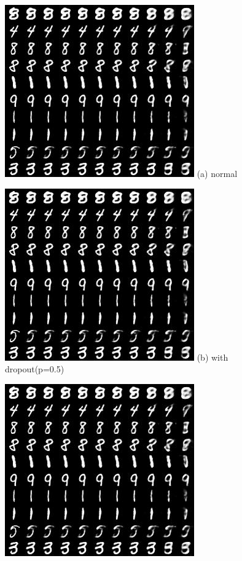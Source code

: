 \documentclass{article}
\begin{document}
    \begin{figure}[h]
    \begin{minipage}{0.33\linewidth}
      \begin{center}
        \includegraphics[scale=0.4]{mnist_ae_chopout_100.jpg}
        \hspace{1.6cm} (a) normal
      \end{center}
    \end{minipage}
    \begin{minipage}{0.33\linewidth}
      \begin{center}
        \includegraphics[scale=0.4]{mnist_ae_chopout_100.jpg}
        \hspace{1.6cm} (b) with dropout(p=0.5)
      \end{center}
    \end{minipage}
    \begin{minipage}{0.33\linewidth}
      \begin{center}
        \includegraphics[scale=0.4]{mnist_ae_chopout_100.jpg}

\end{center}
\end{minipage}
\end{figure}
\end{document}
